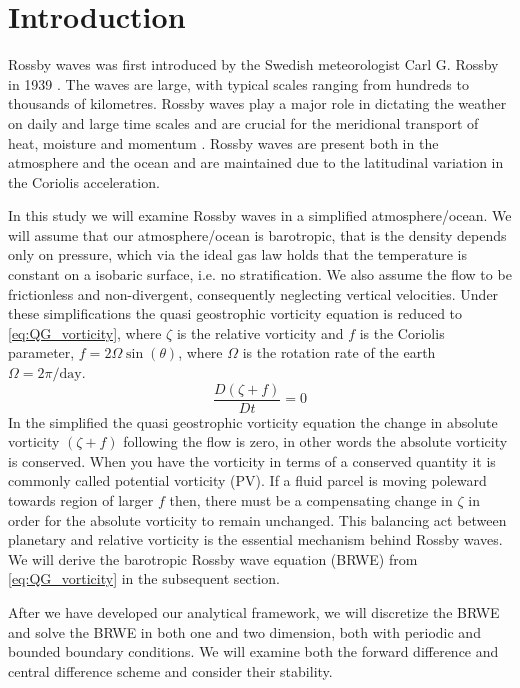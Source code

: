 \section{Introduction}
Rossby waves was first introduced by the Swedish meteorologist
Carl G. Rossby in 1939 \parencite{Rossby1939}. The waves are large, with typical scales ranging from 
hundreds to thousands of kilometres. Rossby waves play a major role in dictating
the weather on daily and large time scales and are crucial for the meridional
transport of heat, moisture and momentum \parencite{midSynDyn}. 
Rossby waves are present both in the atmosphere and the ocean and are maintained
due to the latitudinal variation in the Coriolis acceleration.

In this study we will examine Rossby waves in a simplified 
atmosphere/ocean. We will assume that our atmosphere/ocean is barotropic, that
is the density depends only on pressure, which via the ideal gas law holds that
the temperature is constant on a isobaric surface, i.e. no stratification. We also assume the flow to be frictionless and
non-divergent, consequently neglecting vertical velocities. Under these
simplifications the quasi geostrophic vorticity equation is reduced to
\cref{eq:QG_vorticity}, where $\zeta$ is the relative vorticity and $f$ is the
Coriolis parameter, $f=2\Omega \sin(\theta)$, where $\Omega$ is
the rotation rate of the earth $\Omega = 2\pi/ \mathrm{day}$.
\begin{equation}\label{eq:QG_vorticity}
    \frac{D(\zeta + f)}{Dt} = 0
\end{equation}
In the simplified the quasi geostrophic vorticity equation the
change in absolute vorticity $(\zeta + f)$ following the flow is zero, in other
words the absolute vorticity is conserved. When you have the vorticity in terms
of a conserved quantity it is commonly called potential vorticity (PV). If a fluid parcel is moving
poleward towards region of larger $f$ then, there must be a compensating change
in $\zeta$ in order for the absolute vorticity to remain unchanged. This
balancing act between planetary and relative vorticity is the essential
mechanism behind
Rossby waves. We will derive the barotropic Rossby
wave equation (BRWE) from \cref{eq:QG_vorticity} in the subsequent section.

After we have developed our analytical framework, we will discretize the BRWE
and solve the BRWE in both one and two dimension, both with periodic and
bounded boundary conditions. We will examine both the forward
difference and central difference scheme and consider their stability. 